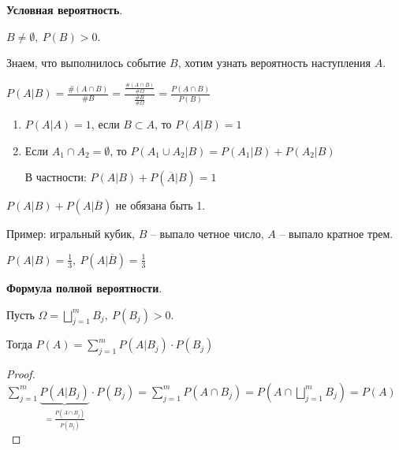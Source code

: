 \begin{definition}
    \textbf{Условная вероятность}.

    $B \not = \emptyset, \ P(B) > 0$.

    Знаем, что выполнилось событие $B$, хотим узнать вероятность наступления $A$.

    $P(A | B) = \frac{\#(A \cap B)}{\#B} = \frac{\frac{\# (A \cap B)}{\#\Omega}}{\frac{\#B}{\#\Omega}} = \frac{P(A \cap B)}{P(B)}$
\end{definition}

\begin{properties}
    \begin{enumerate}
        \item $P(A | A) = 1$, если $B \subset A$, то $P(A | B) = 1$
        \item {
            Если $A_1 \cap A_2 = \emptyset$, то $P(A_1 \cup A_2 | B) = P(A_1 | B) + P(A_2 | B)$

            В частности: $P(A | B) + P(\overline{A} | B) = 1$
        }
    \end{enumerate}
\end{properties}
\begin{remark}
    $P(A | B) + P(A | \overline{B})$ не обязана быть 1.

    Пример: игральный кубик, $B$ -- выпало четное число, $A$ -- выпало кратное трем.

    $P(A | B) = \frac{1}{3}, \ P(A | \overline{B}) = \frac{1}{3}$
\end{remark}

\begin{theorem}
    \textbf{Формула полной вероятности}.

    Пусть $\Omega = \bigsqcup_{j=1}^{m} B_j, \ P(B_j) > 0$.

    Тогда $P(A) = \sum_{j=1}^{m} P(A | B_j) \cdot P(B_j)$
\end{theorem}

\begin{proof}
    $\sum_{j=1}^{m} \underbrace{P(A | B_j)}_{= \frac{P(A \cap B_j)}{P(B_j)}} \cdot P(B_j) = \sum_{j=1}^{m} P(A \cap B_j) = P(A \cap \bigsqcup_{j=1}^{m} B_j) = P(A)$
\end{proof}

